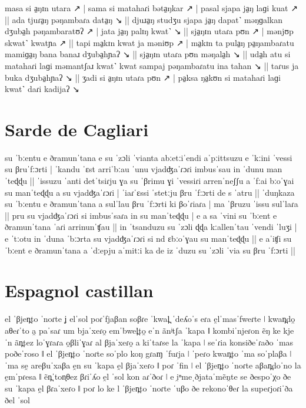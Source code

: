 {masa si a̠ŋɪn utara ↗ | sama si matahaɾi bəta̠ŋkar ↗ | pasal sjapa ja̠ŋ laɡi kuat ↗ || ada tjuɾa̠ŋ pəŋambaɾa data̠ŋ ↘ || djuɹa̠ŋ studʒu sjapa ja̠ŋ dapat˺ məŋɡalkan dʒuba̠h pəŋambaratʊʔ ↗ | jata ja̠ŋ palɪŋ kwat˺ ↘ || sja̠ŋɪn utaɾa pʊn ↗ | mənjʊp skwat˺ kwatɲa ↗ || tapi ma̠kɪn kwat ja məniʊp ↗ | ma̠kɪn ta pula̠ŋ pa̠ŋambaɾatu mamiɡa̠ŋ bana banaɹ dʒuba̠hɲaʔ ↘ || sja̠ŋɪn utaɾa pʊn məŋala̠h ↘ || uda̠h atu si matahaɾi laɡi məmantʃaɹ kwat˺ kwat sampaj pəŋambaɾatu ina tahan ↘ || taɾus ja buka dʒuba̠hɲaʔ ↘ || ʒadi si a̠ŋɪn utaɾa pʊn ↗ | pa̠ksa ŋa̠kʊn si matahaɾi laɡi kwat˺ daɾi kadijaʔ ↘}

\section[Sarde de Cagliari]{Sarde de Cagliari \parencite{mereuCagliariSardinian2019}\\ }

{su ˈbːentu e ðramunˈtana e su ˈzɔli ˈvianta abːetːiˈendi aˈpːittsuzu e ˈkːini ˈvessi su βruˈfːɔrti | ˈkandu ˈɛst arriˈbːau ˈunu vjadʤaˈɾɔɾi imbusˈsau in ˈdunu manˈteɖɖu || ˈissuzu ˈanti detˈtsiɾju ɣa su ˈβrimu ɣi ˈvessiɾi arrenˈneʃʃu a ˈfːai bːoˈɣai su manˈteɖɖu a su vjadʤaˈɾɔɾi | ˈiaɾˈɛssi ˈstetːju βru ˈfːɔrti de s ˈatru || ˈduŋkaza su ˈbːentu e ðramunˈtana a sulˈlau βru ˈfːɔrti ki βoˈɾiaɾa | ma ˈβruzu ˈissu sulˈlaɾa || pru su vjadʤaˈɾɔɾi si imbusˈsaɾa in su manˈteɖɖu | e a sa ˈvini su ˈbːent e ðramunˈtana ˈaɾi arrinunˈʧau || in ˈtsanduzu su ˈzɔli ɖɖa kːallenˈtau ˈvendi ˈluʒi | e ˈtːotu in ˈduna ˈbːɔrta su vjadʤaˈɾɔɾi si nd ɛbːoˈɣau su manˈteɖɖu || e aˈiʧi su ˈbːent e ðramunˈtana a ˈdːepju aˈmitːi ka de iz ˈduzu su ˈzɔli ˈvia su βru ˈfːɔrti ||}


\section[Espagnol castillan]{Espagnol castillan \parencite{martinez-celdranCastilianSpanish2003}\\ }

{el ˈβjen̪to ˈnoɾte ʝ elˈsol poɾˈfjaβan soβɾe ˈkwal̪ ˈdeʎoˈs eɾa e̯lˈmasˈfweɾte ǀ kwan̪do̯ aθeɾˈto a̯ paˈsaɾ um bjaˈxeɾo̯ emˈbwel̪to̯ eˈn ãnʲtʃa ˈkapa ǁ kombiˈnjeɾon ẽŋ ke kje  ˈn ãn̪tez loˈɣɾaɾa o̯βliˈɣaɾ al βjaˈxeɾo̯ a kiˈtaɾse la ˈkapa ǀ seˈɾia konsiðeˈɾaðo ˈmas poðeˈroso ǁ el ˈβjen̪to ˈnoɾte soˈplo koŋ gɾaɱ ˈfuɾja ǀ ˈpeɾo kwan̪to ˈma soˈplaβa ǀ ˈma se̯ areβuˈxaβa e̯n su ˈkapa e̯l βjaˈxeɾo ǁ poɾ ˈfin ǀ el ˈβjen̪to ˈnoɾte aβan̪doˈno la e̯mˈpɾesa ǁ ẽn̪ˈton̟θez βɾiˈʎo e̯l ˈsol kon aɾˈðoɾ ǀ e i̯ⁿmeˌðjataˈmẽn̯te se ðespoˈχo ðe  su ˈkapa e̯l βɾaˈxeɾo ǁ poɾ lo ke l ˈβjen̪to ˈnoɾte ˈuβo ðe rekonoˈθeɾ la supeɾjoɾiˈða ðel ˈsol}

